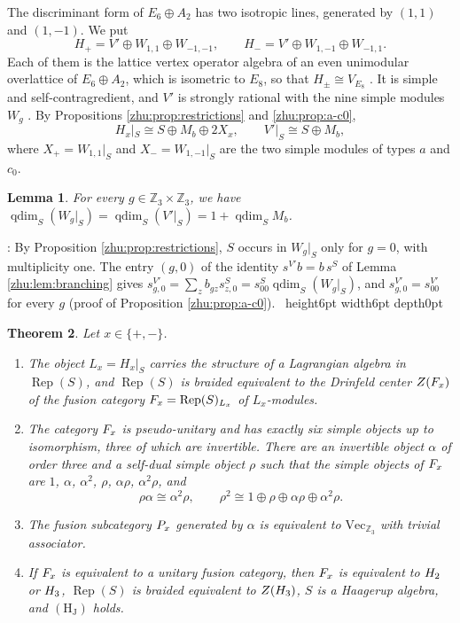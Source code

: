 \documentclass[leqno]{article}
\let\cal\relax
\newcommand{\cal}{\mathcal}
\newcommand{\Z}{\ensuremath{\mathbb{Z}}}
\newcommand{\qed}{\hfill \vrule height6pt  width6pt depth0pt}
\DeclareMathOperator{\Rep}{Rep}
\newtheorem{thm}{Theorem}[section]
\newtheorem{lemma}[thm]{Lemma}
\newenvironment{proof}[1][]{\noindent {\it Proof #1} : }{\hbox{~}\qed
\smallskip
}
\numberwithin{equation}{section}
\begin{document}
The discriminant form of $E_6 \oplus A_2$ has two isotropic lines, generated by $(1,1)$ and $(1,-1)$. We put
\[
H_+ = V' \oplus W_{1,1} \oplus W_{-1,-1}, \qquad H_- = V' \oplus W_{1,-1} \oplus W_{-1,1}.
\]
Each of them is the lattice vertex operator algebra of an even unimodular overlattice of $E_6 \oplus A_2$, which is isometric to $E_8$, so that $H_\pm \cong V_{E_8}$ \cite[Section 2.4 and Lemma 4.1]{ArhII}. It is simple and self-contragredient, and $V'$ is strongly rational with the nine simple modules $W_g$ \cite{Don93}. By Propositions \ref{zhu:prop:restrictions} and \ref{zhu:prop:a-c0},
\[
H_x|_S \cong S \oplus M_b \oplus 2X_x, \qquad V'|_S \cong S \oplus M_b,
\]
where $X_+ = W_{1,1}|_S$ and $X_- = W_{1,-1}|_S$ are the two simple modules of types $a$ and $c_0$.

\begin{lemma}
\label{zhu:lem:qdim-lattice}
For every $g \in \Z_3 \times \Z_3$, we have $\operatorname{qdim}_S (W_g|_S) = \operatorname{qdim}_S(V'|_S) = 1 + \operatorname{qdim}_S M_b$.
\end{lemma}

\begin{proof}
By Proposition \ref{zhu:prop:restrictions}, $S$ occurs in $W_g|_S$ only for $g = 0$, with multiplicity one. The entry $(g,0)$ of the identity $s^{V'} b = b\, s^S$ of Lemma \ref{zhu:lem:branching} gives $s^{V'}_{g,0} = \sum_z b_{gz} s^S_{z,0} = s^S_{00}\operatorname{qdim}_S(W_g|_S)$, and $s^{V'}_{g,0} = s^{V'}_{00}$ for every $g$ (proof of Proposition \ref{zhu:prop:a-c0}).
\end{proof}

\begin{thm}
\label{zhu:thm:categorical}
Let $x \in \{+,-\}$.
\begin{enumerate}
\item The object $L_x = H_x|_S$ carries the structure of a Lagrangian algebra in $\Rep(S)$, and $\Rep(S)$ is braided equivalent to the Drinfeld center $Z(\cal F_x)$ of the fusion category $\cal F_x = \Rep(S)_{L_x}$ of $L_x$-modules.
\item The category $\cal F_x$ is pseudo-unitary and has exactly six simple objects up to isomorphism, three of which are invertible. There are an invertible object $\alpha$ of order three and a self-dual simple object $\rho$ such that the simple objects of $\cal F_x$ are $1$, $\alpha$, $\alpha^2$, $\rho$, $\alpha\rho$, $\alpha^2\rho$, and
\[
\rho\alpha \cong \alpha^2\rho, \qquad \rho^2 \cong 1 \oplus \rho \oplus \alpha\rho \oplus \alpha^2\rho.
\]
\item The fusion subcategory $\cal P_x$ generated by $\alpha$ is equivalent to $\mathrm{Vec}_{\Z_3}$ with trivial associator.
\item If $\cal F_x$ is equivalent to a unitary fusion category, then $\cal F_x$ is equivalent to $\cal H_2$ or $\cal H_3$, $\Rep(S)$ is braided equivalent to $Z(\cal H_3)$, $S$ is a Haagerup algebra, and $\mathrm{(H_J)}$ holds.
\end{enumerate}
\end{thm}
\end{document}
